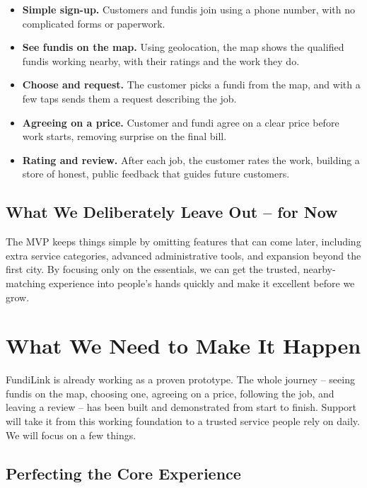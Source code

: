 \documentclass[11pt,a4paper]{article}
\begin{document}
\begin{itemize}[leftmargin=1.5em, label={--}]
    \item \textbf{Simple sign-up.} Customers and fundis join using a phone number, with no
          complicated forms or paperwork.
    \item \textbf{See fundis on the map.} Using geolocation, the map shows the qualified fundis
          working nearby, with their ratings and the work they do.
    \item \textbf{Choose and request.} The customer picks a fundi from the map, and with a few
          taps sends them a request describing the job.
    \item \textbf{Agreeing on a price.} Customer and fundi agree on a clear price before work
          starts, removing surprise on the final bill.
    \item \textbf{Rating and review.} After each job, the customer rates the work, building a
          store of honest, public feedback that guides future customers.
\end{itemize}

\subsection{What We Deliberately Leave Out -- for Now}

The MVP keeps things simple by omitting features that can come later, including extra service
categories, advanced administrative tools, and expansion beyond the first city. By focusing
only on the essentials, we can get the trusted, nearby-matching experience into people's hands
quickly and make it excellent before we grow.

\section{What We Need to Make It Happen}

FundiLink is already working as a proven prototype. The whole journey -- seeing fundis on the
map, choosing one, agreeing on a price, following the job, and leaving a review -- has been
built and demonstrated from start to finish. Support will take it from this working foundation
to a trusted service people rely on daily. We will focus on a few things.

\subsection{Perfecting the Core Experience}
\end{document}
